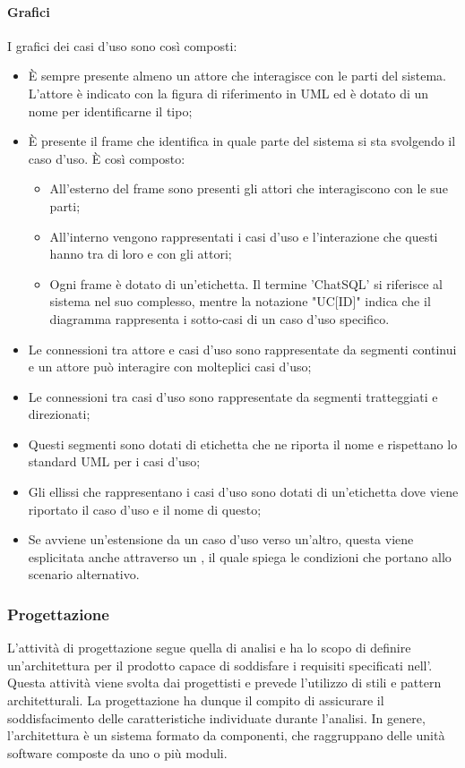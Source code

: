 \paragraph{Grafici}
I grafici dei casi d'uso sono così composti:
\begin{itemize}
  \item È sempre presente almeno un attore che interagisce con le parti del sistema. L'attore è indicato con la figura di riferimento in UML ed è dotato di un nome per identificarne il tipo;
  \item È presente il frame che identifica in quale parte del sistema si sta svolgendo il caso d'uso. È così composto:
  \begin{itemize}
    \item All'esterno del frame sono presenti gli attori che interagiscono con le sue parti;
    \item All'interno vengono rappresentati i casi d'uso e l'interazione che questi hanno tra di loro e con gli attori;
    \item Ogni frame è dotato di un'etichetta. Il termine 'ChatSQL' si riferisce al sistema nel suo complesso, mentre la notazione "UC[ID]" indica che il diagramma rappresenta i sotto-casi di un caso d'uso specifico.
  \end{itemize}
  \item Le connessioni tra attore e casi d'uso sono rappresentate da segmenti continui e un attore può interagire con molteplici casi d'uso;
  \item Le connessioni tra casi d'uso sono rappresentate da segmenti tratteggiati e direzionati;
  \item Questi segmenti sono dotati di etichetta che ne riporta il nome e rispettano lo standard UML per i casi d'uso;
  \item Gli ellissi che rappresentano i casi d'uso sono dotati di un'etichetta dove viene riportato il caso d'uso e il nome di questo;
  \item Se avviene un'estensione da un caso d'uso verso un'altro, questa viene esplicitata anche attraverso un , il quale spiega le condizioni che portano allo scenario alternativo.
\end{itemize}

\subsubsection{Progettazione}\label{progettazione}
\par L'attività di progettazione segue quella di analisi e ha lo scopo di definire un'architettura per il prodotto capace di soddisfare i requisiti specificati nell’\AnalisiDeiRequisiti. Questa attività viene svolta dai progettisti e prevede l'utilizzo di stili e pattern architetturali. La progettazione ha dunque il compito di assicurare il soddisfacimento delle caratteristiche individuate durante l'analisi. In genere, l'architettura è un sistema formato da componenti, che raggruppano delle unità software composte da uno o più moduli.

